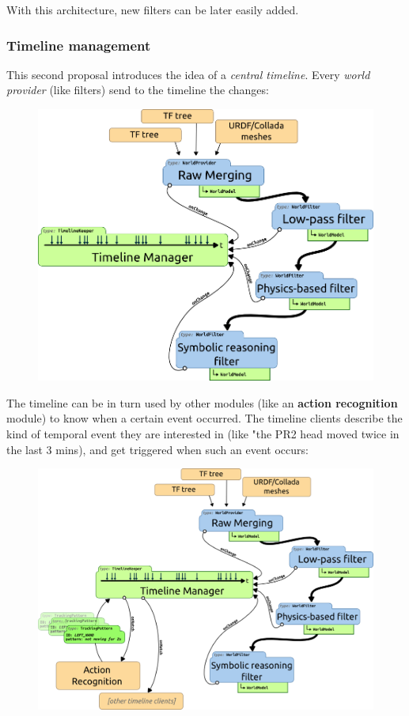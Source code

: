 \documentclass[a4paper]{article}
\begin{document}
With this architecture, new filters can be later easily added.

\subsubsection{Timeline management}

This second proposal introduces the idea of a \emph{central timeline}. Every \emph{world
provider} (like filters) send to the timeline the changes:

\begin{figure}[!h]
    \centering
    \includegraphics[scale=0.5]{images/spark2_archi2_3.png}
\end{figure}

The timeline can be in turn used by other modules (like an \textbf{action
recognition} module) to know when a certain event occurred. The timeline
clients describe the kind of temporal event they are interested in (like "the
PR2 head moved twice in the last 3 mins), and get triggered when such an event
occurs:

\begin{figure}[!h]
    \centering
    \includegraphics[scale=0.5]{images/spark2_archi2_4.png}
\end{figure}
\end{document}
